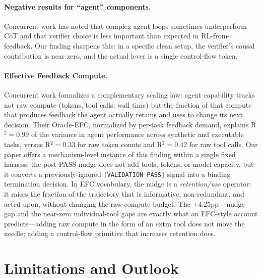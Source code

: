 \documentclass[10pt]{article}
\begin{document}
\paragraph{Negative results for ``agent'' components.} Concurrent work has noted that complex agent loops sometimes underperform CoT and that verifier choice is less important than expected in RL-from-feedback. Our finding sharpens this: in a specific clean setup, the verifier's causal contribution is near zero, and the actual lever is a single control-flow token.

\paragraph{Effective Feedback Compute.} Concurrent work \citep{efc2026} formalizes a complementary scaling law: agent capability tracks not raw compute (tokens, tool calls, wall time) but the fraction of that compute that produces feedback the agent actually retains and uses to change its next decision. Their Oracle-EFC, normalized by per-task feedback demand, explains R$^2{=}0.99$ of the variance in agent performance across synthetic and executable tasks, versus R$^2{=}0.33$ for raw token counts and R$^2{=}0.42$ for raw tool calls. Our paper offers a mechanism-level instance of this finding within a single fixed harness: the post-PASS nudge does not add tools, tokens, or model capacity, but it converts a previously-ignored \texttt{[VALIDATION PASS]} signal into a binding termination decision. In EFC vocabulary, the nudge is a \emph{retention/use} operator: it raises the fraction of the trajectory that is informative, non-redundant, and acted upon, without changing the raw compute budget. The +4.25pp $-$nudge gap and the near-zero individual-tool gaps are exactly what an EFC-style account predicts---adding raw compute in the form of an extra tool does not move the needle; adding a control-flow primitive that increases retention does.

\section{Limitations and Outlook}
\label{sec:limitations}
\end{document}
